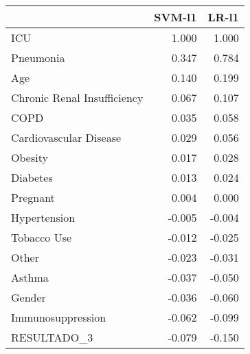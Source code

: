 \begin{tabular}{lrr}
\toprule
{} &  SVM-l1 &  LR-l1 \\
\midrule
ICU                         &   1.000 &  1.000 \\
Pneumonia                   &   0.347 &  0.784 \\
Age                         &   0.140 &  0.199 \\
Chronic Renal Insufficiency &   0.067 &  0.107 \\
COPD                        &   0.035 &  0.058 \\
Cardiovascular Disease      &   0.029 &  0.056 \\
Obesity                     &   0.017 &  0.028 \\
Diabetes                    &   0.013 &  0.024 \\
Pregnant                    &   0.004 &  0.000 \\
Hypertension                &  -0.005 & -0.004 \\
Tobacco Use                 &  -0.012 & -0.025 \\
Other                       &  -0.023 & -0.031 \\
Asthma                      &  -0.037 & -0.050 \\
Gender                      &  -0.036 & -0.060 \\
Immunosuppression           &  -0.062 & -0.099 \\
RESULTADO\_3                 &  -0.079 & -0.150 \\
\bottomrule
\end{tabular}
